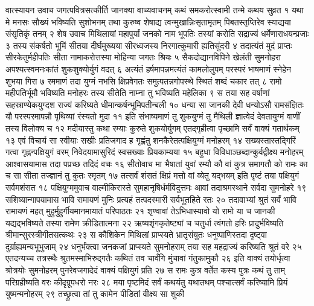 
वात्स्यायन उवाच
जगत्पवित्रसत्कीर्ति जानक्या वाच्यवाचनम्
कथं समकरोत्स्वामी तन्मे कथय सुव्रत १
यथा मे मनसः सौख्यं भविष्यति सुशोभनम्
तथा कुरुष्व शेषाद्य त्वन्मुखान्निःसृतामृतम्
पिबतस्तृप्तिरेव स्याद्यया संसृतिकृं तनम् २
शेष उवाच
मिथिलायां महापुर्यां जनको नाम भूपतिः
तस्यां करोति सद्राज्यं धर्मेणाराधयन्प्रजाः ३
तस्य संकर्षतो भूमिं सीतया दीर्घमुख्यया
सीरध्वजस्य निरगात्कुमारी ह्यतिसुंदरी ४
तदात्यंतं मुदं प्राप्तः सीरकेतुर्महीपतिः
सीता नामाकरोत्तस्या मोहिन्या जगतः श्रियः ५
सैकदोद्यानविपिने खेलंती सुमनोहरा
अपश्यत्स्वमनःकांतं शुकशुक्योर्युगं वदत् ६
अत्यंतं हर्षमापन्नमत्यंतं कामलोलुपम्
परस्परं भाषमाणं स्नेहेन शुभया गिरा ७
रममाणं तदा युग्मं नभसि क्षिप्रवेगतः
समुत्पतन्नगोपस्थे स्थितं शब्दं चकार तत् ८
रामो महीपतिर्भूमौ भविष्यति मनोहरः
तस्य सीतेति नाम्ना तु भविष्यति महेलिका ९
स तया सह वर्षाणां सहस्राण्येकयुग्दश
राज्यं करिष्यते धीमान्कर्षन्भूमिपतीन्बली १०
धन्या सा जानकी देवी धन्योऽसौ रामसंज्ञितः
यौ परस्परमापन्नौ पृथिव्यां रंस्यतो मुदा ११
इति संभाष्यमाणं तु शुकयुग्मं तु मैथिली
ज्ञात्वेदं देवतायुग्मं वाणीं तस्य विलोक्य च १२
मदीयास्तु कथा रम्याः कुरुते शुकयोर्युगम्
एतद्गृहीत्वा पृच्छामि सर्वं वाक्यं गतार्थकम् १३
एवं विचार्य सा स्वीयाः सखीः प्रतिजगाद ह
गृह्णंतु शनकैरेतत्पक्षियुग्मं मनोहरम् १४
सख्यस्तास्तद्गिरिं गत्वा गृह्णन्पक्षियुगं वरम्
निवेदयामासुरिदं स्वसख्याः प्रियकाम्यया १५
बहुधा विविधाञ्छब्दान्कुर्वद्वीक्ष्य मनोहरम्
आश्वासयामास तदा पप्रच्छ तदिदं वचः १६
सीतोवाच
मा भैषातां युवां रम्यौ कौ वां कुत्र समागतौ
को रामः का च सा सीता तज्ज्ञानं तु कुतः स्मृतम् १७
तत्सर्वं शंसतं क्षिप्रं मत्तो वां व्येतु यद्भयम्
इति पृष्टं तया पक्षियुगं सर्वमशंसत १८
पक्षियुग्ममुवाच
वाल्मीकिरास्ते सुमहानृषिर्धर्मविदुत्तमः
आवां तदाश्रमस्थाने सर्वदा सुमनोहरे १९
सशिष्यान्गापयामास भावि रामायणं मुनिः
प्रत्यहं तत्पदस्मारी सर्वभूतहिते रतः २०
तदावाभ्यां श्रुतं सर्वं भावि रामायणं महत्
मुहुर्मुहुर्गीयमानमायातं परिपाठतः २१
शृण्वावां तेऽभिधास्यावो यो रामो या च जानकी
यद्यद्भविष्यते तस्या रामेण क्रीडितात्मना २२
ऋष्यशृंगकृतेष्ट्यां च चतुर्धा त्वंगतो हरिः
प्रादुर्भविष्यति श्रीमान्सुरस्त्रीगीतसत्कथः २३
स कौशिकेन मिथिलां प्राप्स्यते भ्रातृसंयुतः
धनुष्पाणिस्तदा दृष्ट्वा दुर्ग्राह्यमन्यभूभुजाम् २४
धनुर्भंक्त्वा जनकजां प्राप्स्यते सुमनोहराम्
तया सह महद्राज्यं करिष्यति श्रुतं वरे २५
एतदन्यच्च तत्रस्थैः श्रुतमस्माभिरुद्गतैः
कथितं तव चार्वंगि मुंचावां गंतुकामुकौ २६
इति वाक्यं तयोर्धृत्वा श्रोत्रयोः सुमनोहरम्
पुनरेवजगादेदं वाक्यं पक्षियुगं प्रति २७
स रामः कुत्र वर्तेत कस्य पुत्रः कथं तु ताम्
परिग्रहीष्यति वरः कीदृग्रूपधरो नरः २८
मया पृष्टमिदं सर्वं कथयंतु यथातथम्
पश्चात्सर्वं करिष्यामि प्रियं युष्मन्मनोहरम् २९
तच्छ्रुत्वा तां तु कामेन पीडितां वीक्ष्य सा शुकी
